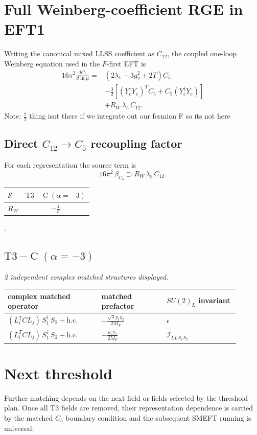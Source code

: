 \documentclass[9pt]{article}
\begin{document}
\section*{Full Weinberg-coefficient RGE in EFT1}
Writing the canonical mixed LLSS coefficient as $C_{12}$, the coupled one-loop Weinberg equation used in the $F$-first EFT is
\begin{align}
16\pi^2\frac{dC_5}{d\ln\mu}={}&(2\lambda_1-3g_2^2+2T)C_5\\
&-\frac32\left[(Y_e^\dagger Y_e)^T C_5+C_5(Y_e^\dagger Y_e)\right]\\
&+R_W\,\lambda_5\,C_{12}.
\end{align}
Note: $\frac{7}{2}$ thing isnt there if we integrate out our fermion F so its not here \subsection*{Direct $C_{12}\to C_5$ recoupling factor}
For each representation the source term is
\[16\pi^2\,\beta_{C_5}\supset R_W\,\lambda_5\,C_{12}.\]
\begin{longtable}{@{}lc@{}}
\toprule
$\mathcal{S}$ & $ \mathrm{T3-C}\;(\alpha=-3) $ \\
\midrule
$R_W$ & $ - \frac{4}{3} $ \\
\bottomrule
\end{longtable}
.
\subsection*{$ \mathrm{T3-C}\;(\alpha=-3) $}
\textit{2 independent complex matched structures displayed. }
\begin{longtable}{@{}p{0.36\linewidth}p{0.25\linewidth}p{0.29\linewidth}@{}}
\toprule
complex matched operator & matched prefactor & $SU(2)_L$ invariant \\
\midrule
$ (L_i^T C L_j)\,S_1^\dagger\,S_2+\mathrm{h.c.} $ & $ - \frac{\sqrt{3} \overline{y_{1}} \overline{y_{2}}}{2 M_F} $ & $ \epsilon $ \\
$ (L_i^T C L_j)\,S_1^\dagger\,S_2+\mathrm{h.c.} $ & $ - \frac{\overline{y_{1}} \overline{y_{2}}}{2 M_F} $ & $ \mathcal{I}_{LLS_1S_2} $ \\
\bottomrule
\end{longtable}
\section*{Next threshold}
Further matching depends on the next field or fields selected by the threshold plan.  Once all T3 fields are removed, their representation dependence is carried by the matched $C_5$ boundary condition and the subsequent SMEFT running is universal.
\end{document}
